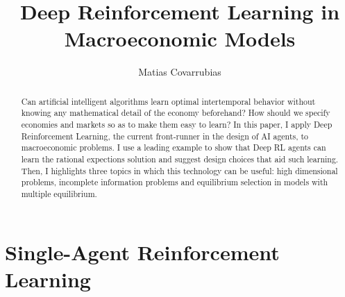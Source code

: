 \documentclass[11pt,english]{article}
\begin{document}
\title{Deep Reinforcement Learning in Macroeconomic Models}
\author{Matias Covarrubias}
\maketitle
\begin{abstract}
Can artificial intelligent algorithms learn optimal intertemporal behavior without knowing any mathematical detail of the economy beforehand?  How should we specify economies and markets so as to make them easy to learn? In this paper, I apply Deep Reinforcement Learning, the current front-runner in the design of AI agents, to macroeconomic problems. I use a leading example to show that Deep RL agents can learn the rational expections solution and suggest design choices that aid such learning. Then, I highlights three topics in which this technology can be useful: high dimensional problems, incomplete information problems and equilibrium selection in models with multiple equilibrium.
\end{abstract}

\section{Single-Agent Reinforcement Learning}
\end{document}
